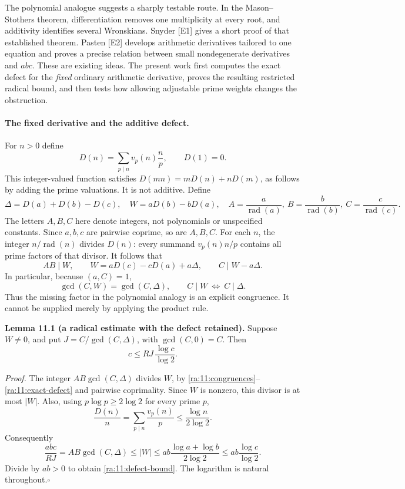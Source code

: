 \documentclass[11pt]{article}
\begin{document}
The polynomial analogue suggests a sharply testable route. In the
Mason--Stothers theorem, differentiation removes one multiplicity at every
root, and additivity identifies several Wronskians. Snyder [E1] gives a
short proof of that established theorem. Pasten [E2] develops arithmetic
derivatives tailored to one equation and proves a precise relation between
small nondegenerate derivatives and $abc$. These are existing ideas. The
present work first computes the exact defect for the \emph{fixed} ordinary
arithmetic derivative, proves the resulting restricted radical bound, and
then tests how allowing adjustable prime weights changes the obstruction.

\paragraph{The fixed derivative and the additive defect.}
For $n>0$ define
\[
 D(n)=\sum_{p\mid n}v_p(n)\frac np,
 \qquad D(1)=0.
\]
This integer-valued function satisfies $D(mn)=mD(n)+nD(m)$, as follows
by adding the prime valuations. It is not additive. Define
\[
 \Delta=D(a)+D(b)-D(c),\quad W=aD(b)-bD(a),\quad
 A=\frac a{\operatorname{rad}(a)},\ B=\frac b{\operatorname{rad}(b)},\
 C=\frac c{\operatorname{rad}(c)}.
\]
The letters $A,B,C$ here denote integers, not polynomials or unspecified
constants. Since $a,b,c$ are pairwise coprime, so are $A,B,C$.
For each $n$, the integer $n/\operatorname{rad}(n)$ divides $D(n)$:
every summand $v_p(n)n/p$ contains all prime factors of that divisor.
It follows that
\begin{equation}\label{ra:11:congruences}
 AB\mid W,\qquad
 W=aD(c)-cD(a)+a\Delta,\qquad C\mid W-a\Delta.
\end{equation}
In particular, because $(a,C)=1$,
\begin{equation}\label{ra:11:exact-defect}
 \gcd(C,W)=\gcd(C,\Delta),\qquad
 C\mid W\ \Longleftrightarrow\ C\mid\Delta.
\end{equation}
Thus the missing factor in the polynomial analogy is an explicit
congruence. It cannot be supplied merely by applying the product rule.

\textbf{Lemma 11.1 (a radical estimate with the defect retained).}
Suppose $W\ne0$, and put
$J=C/\gcd(C,\Delta)$, with $\gcd(C,0)=C$. Then
\begin{equation}\label{ra:11:defect-bound}
 c\le R J\,\frac{\log c}{\log2}.
\end{equation}

\textit{Proof.}
The integer $AB\gcd(C,\Delta)$ divides $W$, by
\eqref{ra:11:congruences}--\eqref{ra:11:exact-defect} and pairwise
coprimality. Since $W$ is nonzero, this divisor is at most $|W|$.
Also, using $p\log p\ge2\log2$ for every prime $p$,
\[
 \frac{D(n)}n=\sum_{p\mid n}\frac{v_p(n)}p
       \le\frac{\log n}{2\log2}.
\]
Consequently
\[
 \frac{abc}{RJ}=AB\gcd(C,\Delta)
       \le |W|
       \le ab\frac{\log a+\log b}{2\log2}
       \le ab\frac{\log c}{\log2}.
\]
Divide by $ab>0$ to obtain \eqref{ra:11:defect-bound}.
The logarithm is natural throughout.\hfill$\square$
\end{document}
